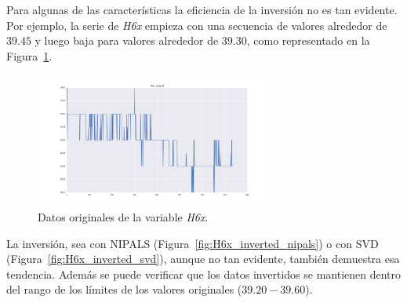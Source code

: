 \documentclass[11pt,spanish,listoffigures,listoftables]{tfgetsinf}
\begin{document}
    Para algunas de las características la eficiencia de la inversión no es tan evidente. Por ejemplo, la serie de {\em H6x} empieza con una secuencia de valores alrededor de \(39.45\) y luego baja para valores alrededor de \(39.30\), como representado en la Figura~\ref{fig:H6x_original}. 
    
    \begin{figure}[h]
        \centering
        \includegraphics[width=0.7\textwidth]{H6x_original.png}
        \caption{Datos originales de la variable {\em H6x}.}
        \label{fig:H6x_original}
    \end{figure}    
    
    La inversión, sea con NIPALS (Figura~\ref{fig:H6x_inverted_nipals}) o con SVD (Figura~\ref{fig:H6x_inverted_svd}), aunque no tan evidente, también demuestra esa tendencia. Además se puede verificar que los datos invertidos se mantienen dentro del rango de los límites de los valores originales (\(39.20-39.60\)).
\end{document}
